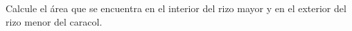 \item Calcule el área que se encuentra en el interior del rizo mayor y en el exterior del rizo menor del caracol.
